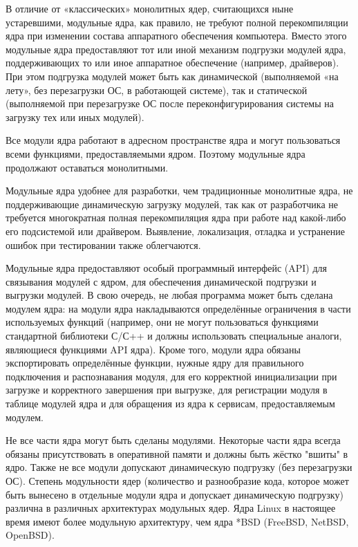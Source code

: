 В отличие от «классических» монолитных ядер, считающихся ныне устаревшими, модульные ядра, как правило, не требуют полной перекомпиляции ядра при изменении состава аппаратного обеспечения компьютера. Вместо этого модульные ядра предоставляют тот или иной механизм подгрузки модулей ядра, поддерживающих то или иное аппаратное обеспечение (например, драйверов). При этом подгрузка модулей может быть как динамической (выполняемой «на лету», без перезагрузки ОС, в работающей системе), так и статической (выполняемой при перезагрузке ОС после переконфигурирования системы на загрузку тех или иных модулей).

Все модули ядра работают в адресном пространстве ядра и могут пользоваться всеми функциями, предоставляемыми ядром. Поэтому модульные ядра продолжают оставаться монолитными.

Модульные ядра удобнее для разработки, чем традиционные монолитные ядра, не поддерживающие динамическую загрузку модулей, так как от разработчика не требуется многократная полная перекомпиляция ядра при работе над какой-либо его подсистемой или драйвером. Выявление, локализация, отладка и устранение ошибок при тестировании также облегчаются.

Модульные ядра предоставляют особый программный интерфейс (API) для связывания модулей с ядром, для обеспечения динамической подгрузки и выгрузки модулей. В свою очередь, не любая программа может быть сделана модулем ядра: на модули ядра накладываются определённые ограничения в части используемых функций (например, они не могут пользоваться функциями стандартной библиотеки С/С++ и должны использовать специальные аналоги, являющиеся функциями API ядра). Кроме того, модули ядра обязаны экспортировать определённые функции, нужные ядру для правильного подключения и распознавания модуля, для его корректной инициализации при загрузке и корректного завершения при выгрузке, для регистрации модуля в таблице модулей ядра и для обращения из ядра к сервисам, предоставляемым модулем.

Не все части ядра могут быть сделаны модулями. Некоторые части ядра всегда обязаны присутствовать в оперативной памяти и должны быть жёстко "вшиты" в ядро. Также не все модули допускают динамическую подгрузку (без перезагрузки ОС). Степень модульности ядер (количество и разнообразие кода, которое может быть вынесено в отдельные модули ядра и допускает динамическую подгрузку) различна в различных архитектурах модульных ядер. Ядра Linux в настоящее время имеют более модульную архитектуру, чем ядра *BSD (FreeBSD, NetBSD, OpenBSD).

